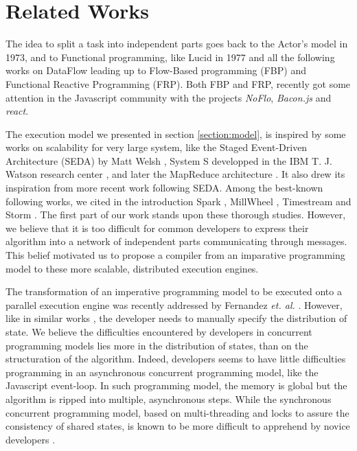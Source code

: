 \section{Related Works} \label{section:related}

The idea to split a task into independent parts goes back to the Actor's model \cite{Hewitt1973} in 1973, and to Functional programming, like Lucid \cite{Ashcroft1977} in 1977 and all the following works on DataFlow leading up to Flow-Based programming (FBP) and Functional Reactive Programming (FRP).
Both FBP and FRP, recently got some attention in the Javascript community with the projects \textit{NoFlo}, \textit{Bacon.js} and \textit{react}.

The execution model we presented in section \ref{section:model}, is inspired by some works on scalability for very large system, like the Staged Event-Driven Architecture (SEDA) by Matt Welsh \cite{Welsh2000}, System S developped in the IBM T. J. Watson research center \cite{Jain2006,Wu2007}, and later the MapReduce architecture \cite{Dean2008}.
It also drew its inspiration from more recent work following SEDA.
Among the best-known following works, we cited in the introduction Spark \cite{Zaharia2010, Zaharia2012}, MillWheel \cite{Akidau2013}, Timestream \cite{Qian2013} and Storm \cite{Toshniwal2014}.
The first part of our work stands upon these thorough studies.
However, we believe that it is too difficult for common developers to express their algorithm into a network of independent parts communicating through messages.
This belief motivated us to propose a compiler from an imparative programming model to these more scalable, distributed execution engines.


The transformation of an imperative programming model to be executed onto a parallel execution engine was recently addressed by Fernandez \textit{et. al.} \cite{Fernandez2014a}.
However, like in similar works \cite{Mitchell2012,Power2010}, the developer needs to manually specify the distribution of state.
We believe the difficulties encountered by developers in concurrent programming models lies more in the distribution of states, than on the structuration of the algorithm.
Indeed, developers seems to have little difficulties programming in an asynchronous concurrent programming model, like the Javascript event-loop.
In such programming model, the memory is global but the algorithm is ripped into multiple, asynchronous steps.
While the synchronous concurrent programming model, based on multi-threading and locks to assure the consistency of shared states, is known to be more difficult to apprehend by novice developers \cite{Adya2002}.


